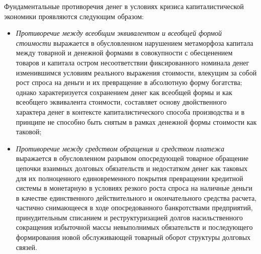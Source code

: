 Фундаментальные противоречия денег в условиях кризиса капиталистической экономики проявляются следующим образом:
\begin{itemize}
    \item \textit{Противоречие между всеобщим эквивалентом и всеобщей формой стоимости} выражается в обусловленном нарушением метаморфоза капитала между товарной и денежной формами в совокупности с обесценением товаров и капитала остром несоответствии фиксированного номинала денег изменившимся условиям реального выражения стоимости, влекущим за собой рост спроса на деньги и их превращение в абсолютную форму богатства; однако характеризуется сохранением денег как всеобщей формы и как всеобщего эквивалента стоимости, составляет основу двойственного характера денег в контексте капиталистического способа производства и в принципе не способно быть снятым в рамках денежной формы стоимости как таковой;
    \item \textit{Противоречие между средством обращения и средством платежа} выражается в обусловленном разрывом опосредующей товарное обращение цепочки взаимных долговых обязательств и недостатком денег как таковых для их полноценного единовременного покрытия превращении кредитной системы в монетарную в условиях резкого роста спроса на наличные деньги в качестве единственного действительного и окончательного средства расчета, частично снимающееся в ходе опосредованного банкротствами предприятий, принудительным списанием и реструктуризацией долгов насильственного сокращения избыточной массы невыполнимых обязательств и последующего формирования новой обслуживающей товарный оборот структуры долговых связей.
\end{itemize}


